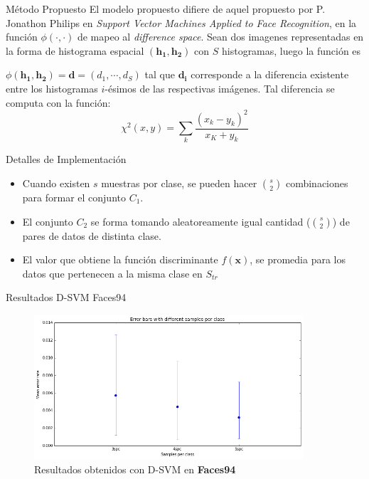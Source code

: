 \documentclass{beamer}
\begin{document}
\begin{frame}{Método Propuesto}
El modelo propuesto difiere de aquel propuesto por P. Jonathon Philips en \textit{Support Vector Machines Applied to Face Recognition}, en la función $\phi(\cdot,\cdot)$ de mapeo al \textit{difference space}. Sean dos imagenes representadas en la forma de histograma espacial $(\mathbf{h_1},\mathbf{h_2})$ con $S$ histogramas, luego la función es

\begin{definition}
	$\phi(\mathbf{h_1}, \mathbf{h_2}) = \mathbf{d} = (d_1, \cdots, d_S)$ tal que $\mathbf{d_i}$ corresponde a la diferencia existente entre los histogramas $i$-ésimos de las respectivas imágenes. Tal diferencia se computa con la función:
	$$\chi^2(x,y) = \sum_k \frac{(x_k - y_k)^2}{x_K + y_k}$$
\end{definition}
\end{frame}


\begin{frame}{Detalles de Implementación}
\begin{itemize}
	\item Cuando existen $s$ muestras por clase, se pueden hacer $\binom{s}{2}$ combinaciones para formar el conjunto $C_1$.
	\item El conjunto $C_2$ se forma tomando aleatoreamente igual cantidad ($\binom{s}{2}$) de pares de datos de distinta clase.
	\item El valor que obtiene la función discriminante $f(\mathbf{x})$, se promedia para los datos que pertenecen a la misma clase en $S_{tr}$
\end{itemize}
\end{frame}


\begin{frame}{Resultados D-SVM Faces94}
\begin{figure}[htpb!]
\centering
\includegraphics[width=10cm]{dsvm_res94}
\caption{Resultados obtenidos con D-SVM en \textbf{Faces94}}
\end{figure}
\end{frame}
\end{document}
